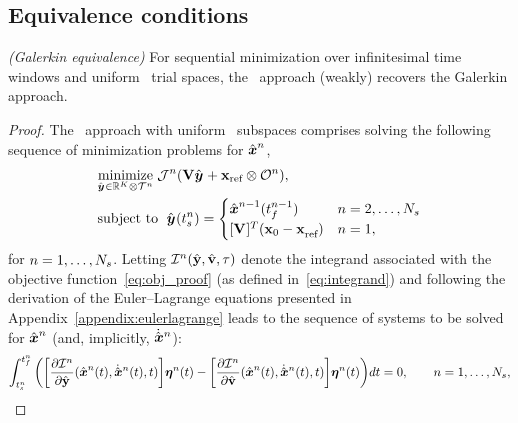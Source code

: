 \subsection{Equivalence conditions}
\begin{theorem}\label{theorem:galerkin_equiv}\textit{(Galerkin equivalence)}
For sequential minimization over infinitesimal time windows and uniform \spatialAcronym\ trial spaces, the \methodAcronym\ approach (weakly) recovers the Galerkin approach.
\end{theorem}
\begin{proof}
The \methodAcronym\ approach with uniform \spatialAcronym\ subspaces comprises solving the following sequence of minimization problems for $\hat{ \boldsymbol x}^{n}$,
\begin{equation}\label{eq:obj_proof}
\begin{split}
      & \underset{\genstateyArgnt{} \in \RR{\romdim} \otimes \timeSpaceArg{n}}{\text{minimize}}\; \mathcal{J}^n(\basisspace \genstateyArgnt{} + \stateIntercept \otimes \onesFunctionArg{n}), \\ 
      & \text{subject to }\; \genstateyArg{}{\timeStartArg{n}} =
\begin{cases} \genstateArg{n-1}{\timeEndArg{n-1}} & n = 2,\ldots,\nslabs \\
\genstateIC & n=1, \end{cases} 
\end{split}
\end{equation}
for $n = 1,\ldots,N_s$. Letting $\mathcal{I}^{n}(\hat{\mathbf{y}},\hat{\mathbf{v}},\tau)$ denote the integrand associated with the objective function~\eqref{eq:obj_proof} (as defined in~\eqref{eq:integrand}) and following the derivation of the Euler--Lagrange equations presented in Appendix~\ref{appendix:eulerlagrange} leads to the sequence of systems to be solved for $\hat{ \boldsymbol x}^n$ (and, implicitly, $\dot{\hat{ \boldsymbol x}}^{n}$):
\begin{equation}\label{eq:g_equiv_1}
 \int_{\timeStartArg{n}}^{\timeEndArg{n}} \bigg( \bigg[ \frac{\partial \minintegrandArg{n}  }{\partial \genstateyDiscrete }(\genstateArg{n}{t},\genstateDotArg{n}{t},t) \bigg]  \variationArgntt{n}{t}  - \bigg[ \frac{\partial \minintegrandArg{n}}{\partial \genstateyDiscreteDot} (\genstateArg{n}{t},\genstateDotArg{n}{t},t ) \bigg] \variationArgntt{n}{t} \bigg)dt  = 0, \qquad n = 1,\ldots,\nslabs,

\end{equation}
\end{proof}
